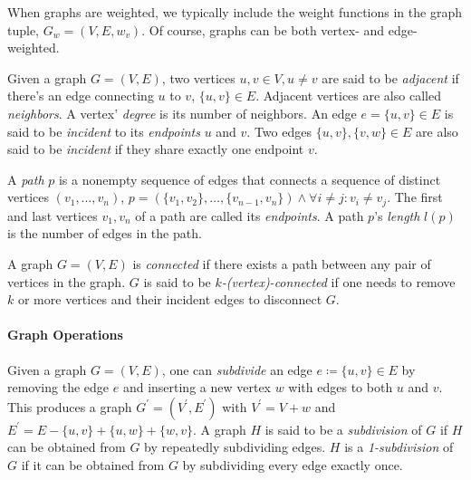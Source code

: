 When graphs are weighted, we typically include the weight functions in the graph tuple, \eg{} $G_w = (V,E,w_v)$. Of course, graphs can be both vertex- and edge-weighted.

\begin{definition}
	Given a graph $G = (V, E)$, two vertices $u, v \in V, u \neq v$ are said to be \emph{adjacent} if there's an edge connecting $u$ to $v$, \ie{} $\{u, v\} \in E$.
	Adjacent vertices are also called \emph{neighbors}.
	A vertex' \emph{degree} is its number of neighbors.
	An edge $e = \{u, v\} \in E$ is said to be \emph{incident} to its \emph{endpoints} $u$ and $v$.
	Two edges $\{u,v\}, \{v,w\} \in E$ are also said to be \emph{incident} if they share exactly one endpoint $v$.
\end{definition}

\begin{definition}
	A \emph{path} $p$ is a nonempty sequence of edges that connects a sequence of distinct vertices $(v_1, \dots, v_n)$, \ie{} $p = (\{v_1, v_2\}, \dots, \{v_{n-1},v_n\}) \land \forall i \neq j \colon v_i \neq v_j$.
	The first and last vertices $v_1, v_n$ of a path are called its \emph{endpoints}.
	A path $p$'s \emph{length} $l(p)$ is the number of edges in the path.
\end{definition}

\begin{definition}
	A graph $G = (V, E)$ is \emph{connected} if there exists a path between any pair of vertices in the graph.
	$G$ is said to be \emph{$k$-(vertex)-connected} if one needs to remove $k$ or more vertices and their incident edges to disconnect $G$.
\end{definition}



\paragraph{Graph Operations}

\begin{definition}
	Given a graph $G = (V, E)$, one can \emph{subdivide} an edge $e \coloneqq \{u,v\} \in E$ by removing the edge $e$ and inserting a new vertex $w$ with edges to both $u$ and $v$. This produces a graph $G^\prime = (V^\prime, E^\prime)$ with $V^\prime = V + w$ and $E^\prime = E - \{u,v\} + \{u,w\} + \{w,v\}$.
	A graph $H$ is said to be a \emph{subdivision} of $G$ if $H$ can be obtained from $G$ by repeatedly subdividing edges.
	$H$ is a \emph{1-subdivision} of $G$ if it can be obtained from $G$ by subdividing every edge exactly once.
\end{definition}

